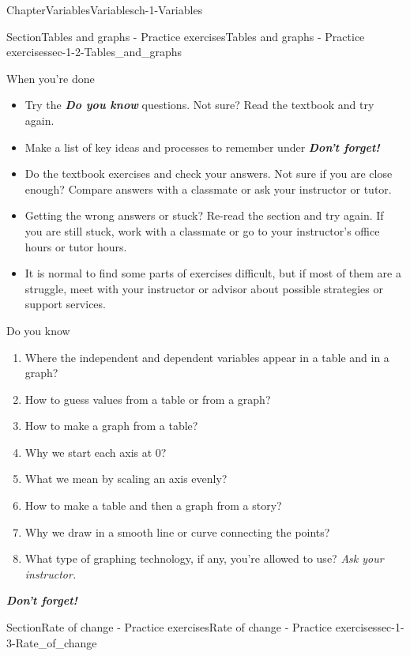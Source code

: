 \documentclass[twoside,11pt,]{book}
\newcommand{\alert}[1]{\textbf{\textit{#1}}}
\numberwithin{equation}{section}
\begin{document}
\begin{chapterptx}{Chapter}{Variables}{}{Variables}{}{}{ch-1-Variables}
\begin{sectionptx}{Section}{Tables and graphs - Practice exercises}{}{Tables and graphs - Practice exercises}{}{}{sec-1-2-Tables_and_graphs}
\begin{conclusion}{When you're done \textellipsis{}}
\begin{itemize}[label=\textbullet]
\item{}Try the \alert{Do you know} questions. Not sure? Read the textbook and try again.%
\item{}Make a list of key ideas and processes to remember under \alert{Don't forget!}%
\item{}Do the textbook exercises and check your answers. Not sure if you are close enough? Compare answers with a classmate or ask your instructor or tutor.%
\item{}Getting the wrong answers or stuck? Re-read the section and try again. If you are still stuck, work with a classmate or go to your instructor's office hours or tutor hours.%
\item{}It is normal to find some parts of exercises difficult, but if most of them are a struggle, meet with your instructor or advisor about possible strategies or support services.%
\end{itemize}
%
\end{conclusion}%
\begin{conclusion}{Do you know \textellipsis{}}%
%
\begin{enumerate}[label={\Alph*.}]
\item{}Where the independent and dependent variables appear in a table and in a graph?%
\item{}How to guess values from a table or from a graph?%
\item{}How to make a graph from a table?%
\item{}Why we start each axis at 0?%
\item{}What we mean by scaling an axis evenly?%
\item{}How to make a table and then a graph from a story?%
\item{}Why we draw in a smooth line or curve connecting the points?%
\item{}What type of graphing technology, if any, you're allowed to use? \emph{Ask your instructor.}%
\end{enumerate}
%
\par
\alert{Don't forget!}%
\end{conclusion}%
\end{sectionptx}
%
%
\typeout{************************************************}
\typeout{************************************************}
%
\begin{sectionptx}{Section}{Rate of change - Practice exercises}{}{Rate of change - Practice exercises}{}{}{sec-1-3-Rate_of_change}
%
%

\end{sectionptx}
\end{chapterptx}
\end{document}
